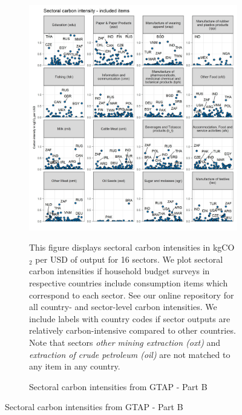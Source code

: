 \begin{figure}[ht!]\ContinuedFloat
\begin{subfigure}[b]{\textwidth}
  \centering
  \caption{Sectoral carbon intensities from GTAP - Part B} \label{fig:B2}  \includegraphics{Analysis_Carbon_Intensities_GTAP/Figure_2.1.1_B_2017}
  \begin{subcaption2}
    This figure displays sectoral carbon intensities in kgCO$_{2}$ per USD of output for 16 sectors. We plot sectoral carbon intensities if household budget surveys in respective countries include consumption items which correspond to each sector. See our online repository for all country- and sector-level carbon intensities. We include labels with country codes if sector outputs are relatively carbon-intensive compared to other countries. Note that sectors \textit{other mining extraction (oxt)} and \textit{extraction of crude petroleum (oil)} are not matched to any item in any country.
  \end{subcaption2}
\end{subfigure}
\end{figure}

\clearpage

